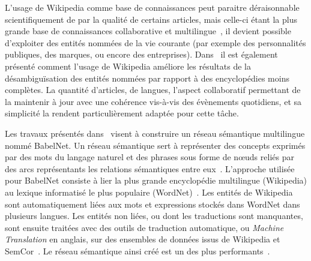 L'usage de Wikipedia comme base de connaissances peut paraitre déraisonnable scientifiquement de par la qualité de certains articles, mais celle-ci étant la plus grande base de connaissances collaborative et multilingue~\cite{navigli2012babelnet}, il devient possible d'exploiter des entités nommées de la vie courante (par exemple des personnalités publiques, des marques, ou encore des entreprises).
Dans~\cite{bunescu-pasca-2006-using} il est également présenté comment l'usage de Wikipedia améliore les résultats de la désambiguïsation des entités nommées par rapport à des encyclopédies moins complètes.
La quantité d'articles, de langues, l'aspect collaboratif permettant de la maintenir à jour avec une cohérence vis-à-vis des évènements quotidiens, et sa simplicité la rendent particulièrement adaptée pour cette tâche.

\bigskip

Les travaux présentés dans~\cite{navigli2012babelnet} visent à construire un réseau sémantique multilingue nommé BabelNet.
Un réseau sémantique sert à représenter des concepts exprimés par des mots du langage naturel et des phrases sous forme de n\oe{}uds reliés par des arcs représentants les relations sémantiques entre eux~\cite{simmons1972semantic}.
L'approche utilisée pour BabelNet consiste à lier la plus grande encyclopédie multilingue (Wikipedia) au lexique informatisé le plus populaire (WordNet)~\cite{navigli2012babelnet}.
Les entités de Wikipedia sont automatiquement liées aux mots et expressions stockés dans WordNet dans plusieurs langues.
Les entités non liées, ou dont les traductions sont manquantes, sont ensuite traitées avec des outils de traduction automatique, ou \textit{Machine Translation} en anglais, sur des ensembles de données issus de Wikipedia et SemCor~\cite{miller1993semantic}.
Le réseau sémantique ainsi créé est un des plus performants~\cite{navigli2012babelnet}.

\bigskip

